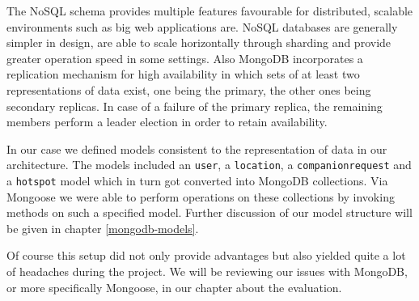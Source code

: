 The NoSQL schema provides multiple features favourable for distributed, scalable environments such as big web applications are. NoSQL databases are generally simpler in design, are able to scale horizontally through sharding and provide greater operation speed in some settings. Also MongoDB incorporates a replication mechanism for high availability in which sets of at least two representations of data exist, one being the primary, the other ones being secondary replicas. In case of a failure of the primary replica, the remaining members perform a leader election in order to retain availability.

In our case we defined models consistent to the representation of data in our architecture. The models included an \texttt{user}, a \texttt{location}, a \texttt{companionrequest} and a \texttt{hotspot} model which in turn got converted into MongoDB collections. Via Mongoose we were able to perform operations on these collections by invoking methods on such a specified model. Further discussion of our model structure will be given in chapter \ref{mongodb-models}.

Of course this setup did not only provide advantages but also yielded quite a lot of headaches during the project. We will be reviewing our issues with MongoDB, or more specifically Mongoose, in our chapter about the evaluation.